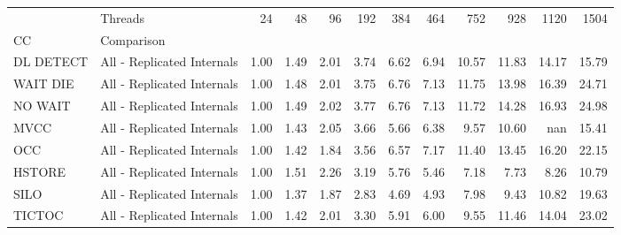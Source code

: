 \begin{tabular}{llrrrrrrrrrr}
\toprule
       & Threads &  24   &  48   &  96   &  192  &  384  &  464  &  752  &  928  &  1120 &  1504 \\
CC & Comparison &       &       &       &       &       &       &       &       &       &       \\
\midrule
DL DETECT & All - Replicated Internals &  1.00 &  1.49 &  2.01 &  3.74 &  6.62 &  6.94 & 10.57 & 11.83 & 14.17 & 15.79 \\
WAIT DIE & All - Replicated Internals &  1.00 &  1.48 &  2.01 &  3.75 &  6.76 &  7.13 & 11.75 & 13.98 & 16.39 & 24.71 \\
NO WAIT & All - Replicated Internals &  1.00 &  1.49 &  2.02 &  3.77 &  6.76 &  7.13 & 11.72 & 14.28 & 16.93 & 24.98 \\
MVCC & All - Replicated Internals &  1.00 &  1.43 &  2.05 &  3.66 &  5.66 &  6.38 &  9.57 & 10.60 &   nan & 15.41 \\
OCC & All - Replicated Internals &  1.00 &  1.42 &  1.84 &  3.56 &  6.57 &  7.17 & 11.40 & 13.45 & 16.20 & 22.15 \\
HSTORE & All - Replicated Internals &  1.00 &  1.51 &  2.26 &  3.19 &  5.76 &  5.46 &  7.18 &  7.73 &  8.26 & 10.79 \\
SILO & All - Replicated Internals &  1.00 &  1.37 &  1.87 &  2.83 &  4.69 &  4.93 &  7.98 &  9.43 & 10.82 & 19.63 \\
TICTOC & All - Replicated Internals &  1.00 &  1.42 &  2.01 &  3.30 &  5.91 &  6.00 &  9.55 & 11.46 & 14.04 & 23.02 \\
\bottomrule
\end{tabular}
